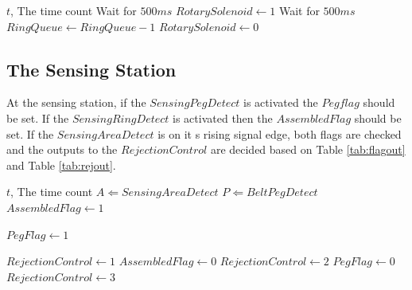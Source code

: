 \documentclass[12pt]{article}
\makeatletter
\newcommand*{\currentname}{\@currentlabelname}
\makeatother
\begin{document}
  \begin{algorithm}[H]
    \caption{\currentname}
    \begin{algorithmic}
      \REQUIRE $t$, The time count
            \STATE Wait for $500ms$
          \ENDIF
          \STATE $RotarySolenoid \leftarrow 1$
          \STATE Wait for $500ms$
          \STATE $RingQueue \leftarrow RingQueue - 1$
        \ELSE
          \STATE $RotarySolenoid \leftarrow 0$
        \ENDIF
      \ENDWHILE
    \end{algorithmic}
  \end{algorithm}

\subsection{The Sensing Station}
  At the sensing station, if the $SensingPegDetect$ is activated the $Pegflag$ should be set. 
  If the $SensingRingDetect$ is activated then the $AssembledFlag$ should be set.
  If the $SensingAreaDetect$ is on it s rising signal edge, both flags are checked and the
  outputs to the $RejectionControl$ are decided based on Table \ref{tab:flagout} and
  Table \ref{tab:rejout}.

  \begin{algorithm}[H]
    \caption{\currentname}
    \begin{algorithmic}
      \REQUIRE $t$, The time count
      \STATE $A \Leftarrow SensingAreaDetect$
      \STATE $P \Leftarrow BeltPegDetect$
          \STATE $AssembledFlag \leftarrow 1$
        \ENDIF

          \STATE $PegFlag \leftarrow 1$
        \ENDIF

            \STATE $RejectionControl \leftarrow 1$
            \STATE $AssembledFlag \leftarrow 0$
              \STATE $RejectionControl \leftarrow 2$
              \STATE $PegFlag \leftarrow 0$
              \STATE $RejectionControl \leftarrow 3$              
            \ENDIF
          \ENDIF
        \ENDIF
      \ENDWHILE        
    \end{algorithmic}
  \end{algorithm}
\end{document}
